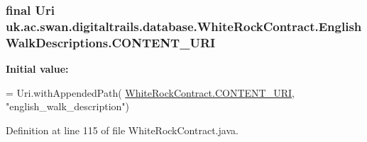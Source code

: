 \hypertarget{classuk_1_1ac_1_1swan_1_1digitaltrails_1_1database_1_1_white_rock_contract_1_1_english_walk_descriptions_ac4d04ff3953fac590e30d090890632e0}{
\subsubsection[{C\+O\+N\+T\+E\+N\+T\+\_\+\+U\+R\+I}]{\setlength{\rightskip}{0pt plus 5cm}final Uri uk.\+ac.\+swan.\+digitaltrails.\+database.\+White\+Rock\+Contract.\+English\+Walk\+Descriptions.\+C\+O\+N\+T\+E\+N\+T\+\_\+\+U\+R\+I\hspace{0.3cm}{\ttfamily [static]}}}\label{classuk_1_1ac_1_1swan_1_1digitaltrails_1_1database_1_1_white_rock_contract_1_1_english_walk_descriptions_ac4d04ff3953fac590e30d090890632e0}
{\bfseries Initial value\+:}
\begin{DoxyCode}
= Uri.withAppendedPath(
                \hyperlink{classuk_1_1ac_1_1swan_1_1digitaltrails_1_1database_1_1_white_rock_contract_abfe96759bfe16773a98099536eef2306}{WhiteRockContract.CONTENT\_URI}, \textcolor{stringliteral}{"english\_walk\_description"})
\end{DoxyCode}


Definition at line 115 of file White\+Rock\+Contract.\+java.

